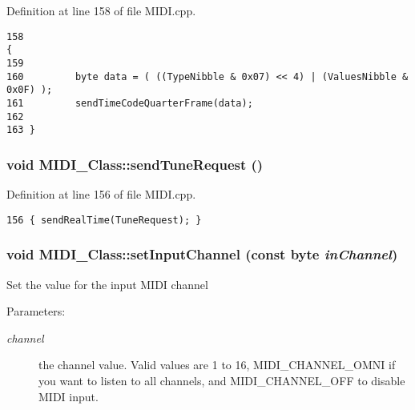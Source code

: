 Definition at line 158 of file MIDI.cpp.

\begin{Code}\begin{verbatim}158                                                                             {
159         
160         byte data = ( ((TypeNibble & 0x07) << 4) | (ValuesNibble & 0x0F) );
161         sendTimeCodeQuarterFrame(data);
162         
163 }
\end{verbatim}
\end{Code}


\hypertarget{class_m_i_d_i___class_9d9a51ca4a888c7c4c0d91a9e678c751}{
\subsubsection[{sendTuneRequest}]{\setlength{\rightskip}{0pt plus 5cm}void MIDI\_\-Class::sendTuneRequest ()}}
\label{class_m_i_d_i___class_9d9a51ca4a888c7c4c0d91a9e678c751}




Definition at line 156 of file MIDI.cpp.

\begin{Code}\begin{verbatim}156 { sendRealTime(TuneRequest); }
\end{verbatim}
\end{Code}


\hypertarget{class_m_i_d_i___class_35a66d47ba598c7ebbee7fbf654dafe8}{
\subsubsection[{setInputChannel}]{\setlength{\rightskip}{0pt plus 5cm}void MIDI\_\-Class::setInputChannel (const byte {\em inChannel})}}
\label{class_m_i_d_i___class_35a66d47ba598c7ebbee7fbf654dafe8}


Set the value for the input MIDI channel \begin{Desc}
\item[Parameters:]
\begin{description}
\item[{\em channel}]the channel value. Valid values are 1 to 16, MIDI\_\-CHANNEL\_\-OMNI if you want to listen to all channels, and MIDI\_\-CHANNEL\_\-OFF to disable MIDI input. \end{description}
\end{Desc}



